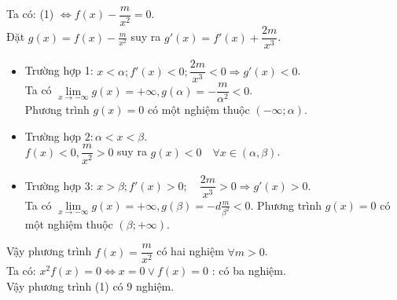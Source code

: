 \begin{ex}
{		Ta có:		(1) $\Leftrightarrow f(x)-\dfrac{m}{x^{2}}=0$. \\
		Đặt $g(x)=f(x)-\frac{m}{x^{2}}$ suy ra $g'(x)=f'(x)+\dfrac{2 m}{x^{3}}$.
		\begin{itemize}
			\item Trường hợp 1: $x<\alpha ; f'(x)<0 ; \dfrac{2 m}{x^{3}}<0 \Rightarrow g'(x)<0$.\\
			Ta có $\lim\limits_{x \to-\infty} g(x)=+\infty, g(\alpha)=-\dfrac{m}{\alpha^{2}}<0$.\\ Phương trình $g(x)=0$ có một nghiệm thuộc $(-\infty ; \alpha)$.\\	
			\item	Trường hợp $2: \alpha<x<\beta$.\\	
			$f(x)<0, \dfrac{m}{x^{2}}>0$ suy ra $g(x)<0 \quad \forall x \in(\alpha, \beta)$.		
			\item	Trường hợp 3: $x>\beta ; f'(x)>0 ; \quad \dfrac{2 m}{x^{3}}>0 \Rightarrow g'(x)>0$.\\	
			Ta có $\lim\limits_{x \to-\infty} g(x)=+\infty, g(\beta)=-d\frac{m}{\beta^{2}}<0$. Phương trình $g(x)=0$ có một nghiệm thuộc $(\beta ;+\infty)$.
		\end{itemize}		
		Vậy phương trình $f(x)=\dfrac{m}{x^{2}}$ có hai nghiệm $\forall m>0$.\\
		Ta có: $x^{2} f(x)=0 \Leftrightarrow x=0 \vee f(x)=0$ : có ba nghiệm.\\	
		Vậy phương trình (1) có 9 nghiệm.
	}
\end{ex}

